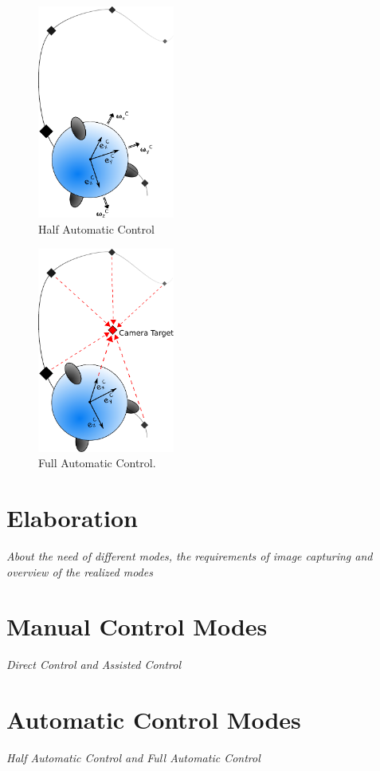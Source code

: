 \begin{figure}[H] %
	\begin{center}
		\includegraphics[width=0.4\textwidth]{HAC.pdf}
		\caption[Half automatic control]{Half Automatic Control}  
		\label{figure:half_automatic_control}		
	\end{center}
\end{figure}


\begin{figure}[H] %
	\begin{center}
		\includegraphics[width=0.4\textwidth]{FAC.pdf}
		\caption[Full automatic control]{Full Automatic Control.}  
		\label{figure:full_automatic_control}		
	\end{center}
\end{figure}


\section{Elaboration}
\label{sec:elaboration}
\textit{About the need of different modes, the requirements of image capturing and overview of the realized modes}
\section{Manual Control Modes}
\label{manualControlModes}
\textit{Direct Control and Assisted Control}
\section{Automatic Control Modes}
\label{automaticControlModes}
\textit{Half Automatic Control and Full Automatic Control}
